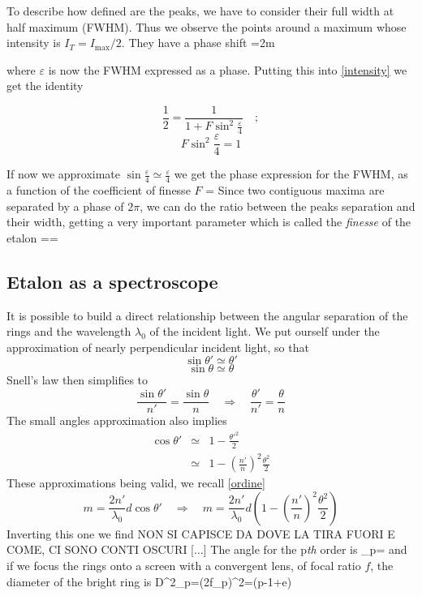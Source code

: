 To describe how defined are the peaks, we have to consider their full width at half maximum (FWHM). Thus we observe the points around a maximum whose intensity is $I_{T}=I_{\mbox{max}}/2$. They have a phase shift 
\mate
\Delta=2m\pi\pm{}
\atem

where $\varepsilon$ is now the FWHM expressed as a phase. Putting this into \cref{intensity} we get the identity

$$\frac{1}{2}=\frac{1}{1+F\sin^2\frac{\varepsilon}{4}}\quad;$$ $$F\sin^2\frac{\varepsilon}{4}=1$$

If now we approximate $\sin\frac{\varepsilon}{4}\simeq\frac{\varepsilon}{4}$ we get the phase expression for the FWHM, as a function of the coefficient of finesse $F$
\mate
\varepsilon=
\atem
Since two contiguous maxima are separated by a phase of $2\pi$, we can do the ratio between the peaks separation and their width, getting a very important parameter which is called the \textit{finesse} of the etalon
\mate
{}\equiv\frac{2\pi}{\varepsilon}==
\label{finesse}
\atem
\subsection{Etalon as a spectroscope}
It is possible to build a direct relationship between the angular separation of the rings and the wavelength $\lambda_0$ of the incident light.
We put ourself under the approximation of nearly perpendicular incident light, so that
$$\sin\theta'\simeq\theta'$$$$\sin\theta\simeq\theta$$
Snell's law then simplifies to
$$\frac{\sin\theta'}{n'}=\frac{\sin\theta}{n}\quad\Rightarrow\quad\frac{\theta'}{n'}=\frac{\theta}{n}$$
The small angles approximation also implies
\begin{eqnarray} 
\nonumber\cos\theta'&\simeq&1-\frac{\theta'^2}{2}\\&\simeq&1-\left(\frac{n'}{n}\right)^2\frac{\theta^2}{2}\nonumber
\end{eqnarray}
These approximations being valid, we recall \cref{ordine}
$$m=\frac{2n'}{\lambda_0}d\cos\theta'\quad\Rightarrow\quad m=\frac{2n'}{\lambda_0}d\left(1-\left(\frac{n'}{n}\right)^2\frac{\theta^2}{2}\right)$$
Inverting this one we find
NON SI CAPISCE DA DOVE LA TIRA FUORI E COME, CI SONO CONTI OSCURI [$\dots$]
The angle for the p\textit{th} order is
\mate
\theta_p=
\atem
and if we focus the rings onto a screen with a convergent lens, of focal ratio $f$, the diameter of the bright ring is
\mate
D^2_p=(2f\theta_p)^2=(p-1+e)
\atem